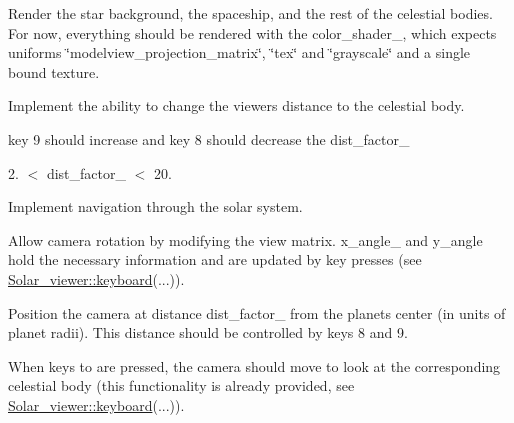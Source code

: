 
\begin{DoxyRefList}
\item[\label{todo__todo000004}%
\hypertarget{todo__todo000004}{}%
Member \hyperlink{classSolar__viewer_af6b468fb543b9c9ed466fe1687f1aff8}{Solar\+\_\+viewer\+:\+:draw\+\_\+scene} (\hyperlink{classmat4}{mat4} \&\+\_\+projection, \hyperlink{classmat4}{mat4} \&\+\_\+view)]Render the star background, the spaceship, and the rest of the celestial bodies. For now, everything should be rendered with the color\+\_\+shader\+\_\+, which expects uniforms \char`\"{}modelview\+\_\+projection\+\_\+matrix\char`\"{}, \char`\"{}tex\char`\"{} and \char`\"{}grayscale\char`\"{} and a single bound texture. 
\item[\label{todo__todo000001}%
\hypertarget{todo__todo000001}{}%
Member \hyperlink{classSolar__viewer_aaf4e3bd2fd0dea72ffafe050a3c2ef7f}{Solar\+\_\+viewer\+:\+:keyboard} (int key, int scancode, int action, int mods)]Implement the ability to change the viewer\textquotesingle{}s distance to the celestial body.
\begin{DoxyItemize}
\item key 9 should increase and key 8 should decrease the {\ttfamily dist\+\_\+factor\+\_\+}
\item 2. $<$ {\ttfamily dist\+\_\+factor\+\_\+} $<$ 20.  
\end{DoxyItemize}
\item[\label{todo__todo000003}%
\hypertarget{todo__todo000003}{}%
Member \hyperlink{classSolar__viewer_ab0c48ceb8d58aefee8c5528c9efa6412}{Solar\+\_\+viewer\+:\+:paint} ()]Implement navigation through the solar system.
\begin{DoxyItemize}
\item Allow camera rotation by modifying the view matrix. {\ttfamily x\+\_\+angle\+\_\+} and {\ttfamily y\+\_\+angle} hold the necessary information and are updated by key presses (see {\ttfamily \hyperlink{classSolar__viewer_aaf4e3bd2fd0dea72ffafe050a3c2ef7f}{Solar\+\_\+viewer\+::keyboard}(...)}).
\item Position the camera at distance {\ttfamily dist\+\_\+factor\+\_\+} from the planet\textquotesingle{}s center (in units of planet radii). This distance should be controlled by keys 8 and 9.
\item When keys {} to {} are pressed, the camera should move to look at the corresponding celestial body (this functionality is already provided, see {\ttfamily \hyperlink{classSolar__viewer_aaf4e3bd2fd0dea72ffafe050a3c2ef7f}{Solar\+\_\+viewer\+::keyboard}(...)}).

\end{DoxyItemize}
\end{DoxyRefList}
